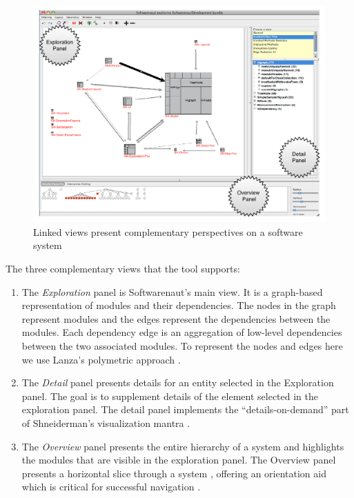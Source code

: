 \documentclass[preprint,12pt]{elsarticle}
\begin{document}
\begin{figure}[ht]
\begin{center}
\includegraphics[width=\linewidth]{SnautOnSnaut.pdf}
\caption{Linked views present complementary perspectives on a software system }
\end{center}
\end{figure}

The three complementary views that the tool supports:

\begin{enumerate}

\item The {\em Exploration} panel is Softwarenaut's main view. It is a graph-based representation of modules and their dependencies. The nodes in the graph represent modules and the edges represent the dependencies between the modules. Each dependency edge is an aggregation of low-level dependencies between the two associated modules. To represent the nodes and edges here we use Lanza's polymetric approach \cite{lanza-pv, lanza-oomp}. 

\item The {\em Detail} panel presents details for an entity selected in the Exploration panel. The goal is to supplement details of the element selected in the exploration panel. The detail panel implements the ``details-on-demand'' part of Shneiderman's visualization mantra \cite{shneid-eyes}.

\item The {\em Overview} panel presents the entire hierarchy of a system and highlights the modules that are visible in the exploration panel. The Overview panel presents a horizontal slice through a system \cite{wong-thesis}, offering an orientation aid which is critical for successful navigation \cite{storey-awareness}.

\end{enumerate}
\end{document}
